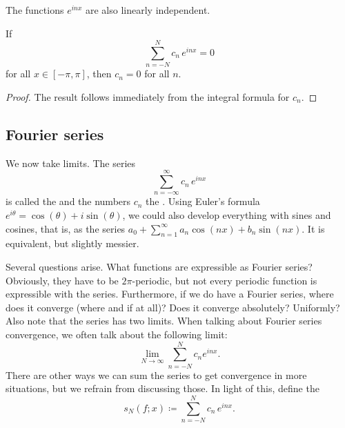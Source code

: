 The functions $e^{inx}$ are also linearly independent.

\begin{prop}
If
\begin{equation*}
\sum_{n=-N}^N c_n \, e^{inx} = 0
\end{equation*}
for all $x \in [-\pi,\pi]$, then $c_n = 0$ for all $n$.
\end{prop}

\begin{proof}
The result follows immediately from the integral formula for $c_n$.
\end{proof}

\subsection{Fourier series}

We now take limits.  The series
\begin{equation*}
\sum_{n=-\infty}^\infty c_n \, e^{inx}
\end{equation*}
is called
the \emph{} and the numbers $c_n$
the \emph{}.  Using
Euler's formula $e^{i\theta} = \cos(\theta) + i \sin (\theta)$,
we could also develop everything with
sines and cosines, that is, as the series
$a_0 + \sum_{n=1}^\infty a_n \cos(nx) + b_n \sin(nx)$.
It is equivalent, but slightly messier.

Several questions arise.  What functions are expressible as 
Fourier series?  Obviously, they have to be $2\pi$-periodic, but not every
periodic function is expressible with the series.  Furthermore, if we do have
a Fourier series, where does it converge (where and if at all)?  Does it converge
absolutely?  Uniformly?  Also note that the series has two
limits.  When talking about Fourier series convergence, we often
talk about the following limit:
\begin{equation*}
\lim_{N\to\infty} 
\sum_{n=-N}^N c_n e^{inx} .
\end{equation*}
There are other ways we can sum the series to get convergence in more
situations, but we refrain from discussing those.  In light of this,
define the \emph{}
\begin{equation*}
s_N(f;x) \coloneqq 
\sum_{n=-N}^N c_n \,e^{inx} .
\end{equation*}

\medskip

